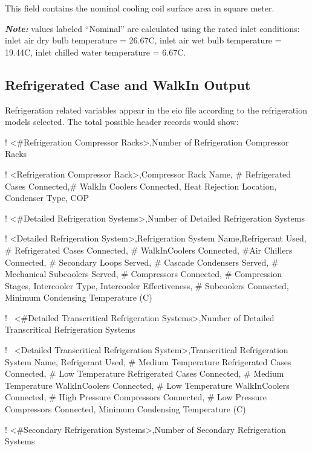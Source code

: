 This field contains the nominal cooling coil surface area in square meter.

\textbf{\emph{Note:}} values labeled ``Nominal'' are calculated using the rated inlet conditions: inlet air dry bulb temperature = 26.67C, inlet air wet bulb temperature = 19.44C, inlet chilled water temperature = 6.67C.

\subsection{Refrigerated Case and WalkIn Output}\label{refrigerated-case-and-walkin-output}

Refrigeration related variables appear in the eio file according to the refrigeration models selected. The total possible header records would show:

! \textless{}\#Refrigeration Compressor Racks\textgreater{},Number of Refrigeration Compressor Racks

! \textless{}Refrigeration Compressor Rack\textgreater{},Compressor Rack Name, \# Refrigerated Cases Connected,\# WalkIn Coolers Connected, Heat Rejection Location, Condenser Type, COP

! \textless{}\#Detailed Refrigeration Systems\textgreater{},Number of Detailed Refrigeration Systems

! \textless{}Detailed Refrigeration System\textgreater{},Refrigeration System Name,Refrigerant Used, \# Refrigerated Cases Connected, \# WalkInCoolers Connected, \#Air Chillers Connected, \# Secondary Loops Served, \# Cascade Condensers Served, \# Mechanical Subcoolers Served, \# Compressors Connected, \# Compression Stages, Intercooler Type, Intercooler Effectiveness, \# Subcoolers Connected, Minimum Condensing Temperature (C)

!~ \textless{}\#Detailed Transcritical Refrigeration Systems\textgreater{},Number of Detailed Transcritical Refrigeration Systems

!~ \textless{}Detailed Transcritical Refrigeration System\textgreater{},Transcritical Refrigeration System Name, Refrigerant Used, \# Medium Temperature Refrigerated Cases Connected, \# Low Temperature Refrigerated Cases Connected, \# Medium Temperature WalkInCoolers Connected, \# Low Temperature WalkInCoolers Connected, \# High Pressure Compressors Connected, \# Low Pressure Compressors Connected, Minimum Condensing Temperature (C)

! \textless{}\#Secondary Refrigeration Systems\textgreater{},Number of Secondary Refrigeration Systems

